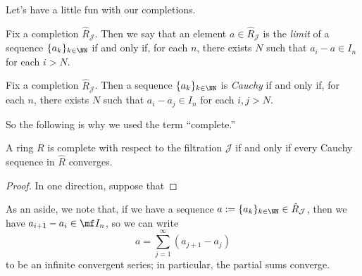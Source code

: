 Let's have a little fun with our completions.
\begin{definition}[Limit]
	Fix a completion $\hat R_\mathcal J$. Then we say that an element $a\in\hat R_\mathcal J$ is the \textit{limit} of a sequence $\{a_k\}_{k\in\NN}$ if and only if, for each $n$, there exists $N$ such that $a_i-a\in I_n$ for each $i>N$.
\end{definition}
\begin{definition}
	Fix a completion $\hat R_\mathcal J$. Then a sequence $\{a_k\}_{k\in\NN}$ is \textit{Cauchy} if and only if, for each $n$, there exists $N$ such that $a_i-a_j\in I_n$ for each $i,j>N$.
\end{definition}
So the following is why we used the term ``complete.''
\begin{lemma}
	A ring $R$ is complete with respect to the filtration $\mathcal J$ if and only if every Cauchy sequence in $\hat R$ converges.
\end{lemma}
\begin{proof}
	In one direction, suppose that
\end{proof}
As an aside, we note that, if we have a sequence $a:=\{a_k\}_{k\in\NN}\in\hat R_\mathcal J$, then we have $a_{i+1}-a_i\in\mf I_n$, so we can write
\[a=\sum_{j=1}^\infty(a_{j+1}-a_j)\]
to be an infinite convergent series; in particular, the partial sums converge.

